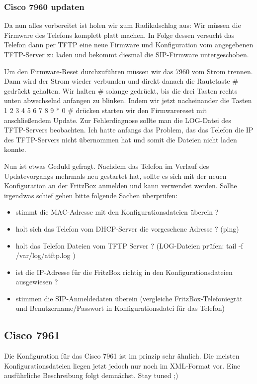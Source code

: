 \documentclass[a4paper,12pt]{scrbook}
\begin{document}
\subsubsection{Cisco 7960 updaten}
Da nun alles vorbereitet ist holen wir zum Radikalschlag aus: Wir müssen die Firmware des Telefons komplett platt machen. In Folge dessen versucht das
Telefon dann per TFTP eine neue Firmware und Konfiguration vom angegebenen TFTP-Server zu laden und bekommt diesmal die SIP-Firmware untergeschoben.

Um den Firmware-Reset durchzuführen müssen wir das 7960 vom Strom trennen. Dann wird der Strom wieder verbunden und direkt danach die Rautetaste \# gedrückt gehalten.
Wir halten \# solange gedrückt, bis die drei Tasten rechts unten abwechselnd anfangen zu blinken. Indem wir jetzt nacheinander die Tasten 1 2 3 4 5 6 7 8 9 * 0 \# drücken starten wir den
Firmwarereset mit anschließendem Update. Zur Fehlerdiagnose sollte man die LOG-Datei des TFTP-Servers beobachten. Ich hatte anfangs das Problem, das das Telefon die IP des TFTP-Servers
nicht übernommen hat und somit die Dateien nicht laden konnte. 

Nun ist etwas Geduld gefragt. Nachdem das Telefon im Verlauf des Updatevorgangs mehrmals neu gestartet hat, sollte es sich mit der neuen Konfiguration an der FritzBox anmelden und kann 
verwendet werden. Sollte irgendwas schief gehen bitte folgende Sachen überprüfen:

\begin{itemize}
 \item stimmt die MAC-Adresse mit den Konfigurationsdateien überein ?
 \item holt sich das Telefon vom DHCP-Server die vorgesehene Adresse ? (ping)
 \item holt das Telefon Dateien vom TFTP Server ? (LOG-Dateien prüfen: tail -f /var/log/atftp.log )
 \item ist die IP-Adresse für die FritzBox richtig in den Konfigurationsdateien ausgewiesen ?
 \item stimmen die SIP-Anmeldedaten überein (vergleiche FritzBox-Telefoniegrät und Benutzername/Passwort in Konfigurationsdatei für das Telefon) 
\end{itemize}


\subsection{Cisco 7961}
Die Konfiguration für das Cisco 7961 ist im prinzip sehr ähnlich. Die meisten Konfigurationsdateien liegen jetzt jedoch nur noch im XML-Format vor.
Eine ausführliche Beschreibung folgt demnächst. Stay tuned ;)
\end{document}
